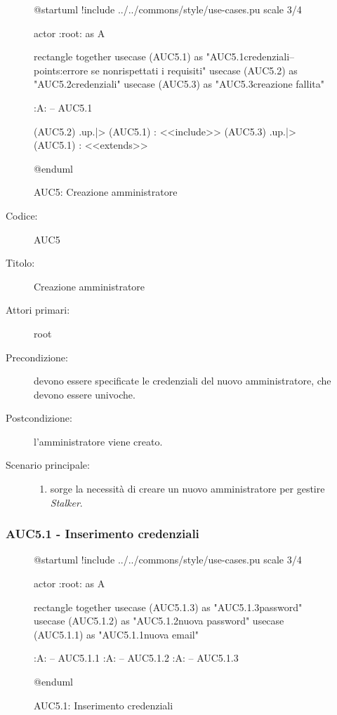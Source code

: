 \documentclass[casi-duso]{subfiles}
\begin{document}
\begin{figure}[h!] 
  \centering 
  \begin{plantuml}
  @startuml
  !include ../../commons/style/use-cases.pu
  scale 3/4

  actor :root: as A

  rectangle {
    together {
      usecase (AUC5.1) as "AUC5.1\nInserimento credenziali\n--\nExtension points:\nvisualizzazione errore se non\nvengono rispettati i requisiti"
      usecase (AUC5.2) as "AUC5.2\nVerifica credenziali"
      usecase (AUC5.3) as "AUC5.3\nVisualizza creazione fallita"
    }
  }

  :A: -- AUC5.1

  (AUC5.2) .up.|> (AUC5.1) : <<include>>
  (AUC5.3) .up.|> (AUC5.1) : <<extends>>

  @enduml
  \end{plantuml} 
  \caption{AUC5: Creazione amministratore} 
  \label{fig:auc5} 
\end{figure}

\begin{description}
  \item[Codice:] AUC5
  \item[Titolo:] Creazione amministratore
  \item[Attori primari:] root
  \item[Precondizione:] devono essere specificate le credenziali del nuovo amministratore, che devono essere univoche.
  \item[Postcondizione:] l'amministratore viene creato.
  \item[Scenario principale:]
  \begin{enumerate}
    \item sorge la necessità di creare un nuovo amministratore per gestire \emph{Stalker}.
  \end{enumerate}
\end{description}


\subsubsection{AUC5.1 - Inserimento credenziali}%
\label{subsub:AUC5.1}

\begin{figure}[h!] 
  \centering 
  \begin{plantuml}
  @startuml
  !include ../../commons/style/use-cases.pu
  scale 3/4

  actor :root: as A

  rectangle {
    together {
      usecase (AUC5.1.3) as "AUC5.1.3\nConferma password"
      usecase (AUC5.1.2) as "AUC5.1.2\nInserimento nuova password"
      usecase (AUC5.1.1) as "AUC5.1.1\nInserimento nuova email"
    }
  }

  :A: -- AUC5.1.1
  :A: -- AUC5.1.2
  :A: -- AUC5.1.3

  @enduml
  \end{plantuml} 
  \caption{AUC5.1: Inserimento credenziali} 
  \label{fig:auc5_1} 
\end{figure}
\end{document}
